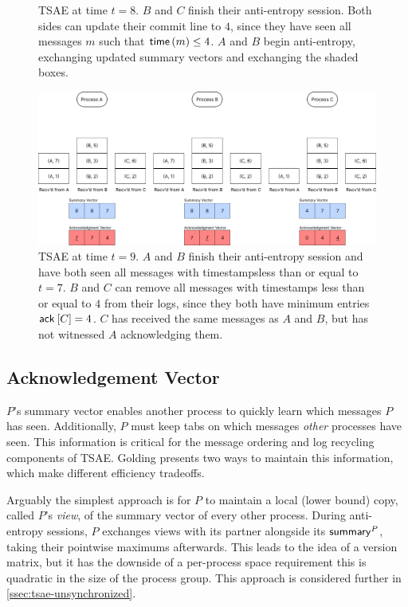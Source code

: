 \documentclass[]             %
{NASA}                       %
\theoremstyle{definition}
\begin{document}
\begin{landscape}
\begin{figure}[h]
    \caption{TSAE at time $t=8$. $B$ and $C$ finish their anti-entropy session. Both sides can update their commit line to $4$, since they have seen all messages $m$ such that $\mathsf{time}\left(m\right) \leq 4$. $A$ and $B$ begin anti-entropy, exchanging updated summary vectors and exchanging the shaded boxes.}
    \label{fig:tsae6}
  \end{figure}
  \begin{figure}[h]
    \centering
    \includegraphics[width=1.4\textwidth]{images/tsaenew/TSAE9.png}
    \caption{TSAE at time $t=9$. $A$ and $B$ finish their anti-entropy
      session and have both seen all messages with timestampsless than
      or equal to $t = 7$. $B$ and $C$ can remove all messages with
      timestamps less than or equal to $4$ from their logs, since they
      both have minimum entries $\mathsf{ack}^{}\left[C\right] = 4$. $C$ has received the
      same messages as $A$ and $B$, but has not witnessed $A$
      acknowledging them.}
    \label{fig:tsae6}
  \end{figure}
\end{landscape}

\subsection{Acknowledgement Vector}
\label{ssec:tsae-acknowledgement}
$P$'s summary vector enables another process to quickly learn which
messages $P$ has seen. Additionally, $P$ must keep tabs on which
messages \emph{other} processes have seen. This information is
critical for the message ordering and log recycling components of
TSAE. Golding presents two ways to maintain this information, which
make different efficiency tradeoffs.

Arguably the simplest approach is for $P$ to maintain a local (lower
bound) copy, called $P$'s \emph{view}, of the summary vector of every
other process. During anti-entropy sessions, $P$ exchanges views with
its partner alongside its $\mathsf{summary}^{P}$, taking their pointwise
maximums afterwards. This leads to the idea of a version matrix, but
it has the downside of a per-process space requirement this is
quadratic in the size of the process group. This approach is
considered further in \ref{ssec:tsae-unsynchronized}.
\end{document}
